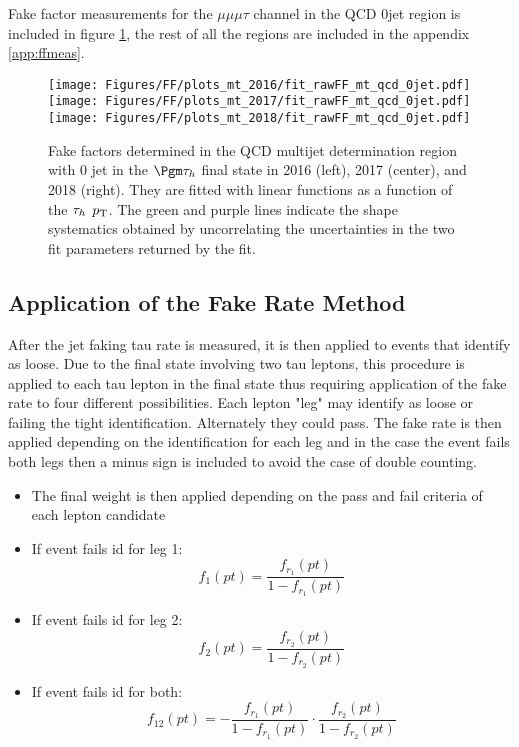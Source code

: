 Fake factor measurements for the $\mu\mu\mu\tau$ channel in the QCD 0jet region is included in figure \ref{fig:fit_raw_mt_0jet_qcd}, the rest of all the regions are included in the appendix \ref{app:ffmeas}.




\begin{figure}[ht!b]
\centering
\texttt{[image: Figures/FF/plots\_mt\_2016/fit\_rawFF\_mt\_qcd\_0jet.pdf]}
\texttt{[image: Figures/FF/plots\_mt\_2017/fit\_rawFF\_mt\_qcd\_0jet.pdf]}
\texttt{[image: Figures/FF/plots\_mt\_2018/fit\_rawFF\_mt\_qcd\_0jet.pdf]}\\
\caption{\label{fig:fit_raw_mt_0jet_qcd} Fake factors determined in the QCD multijet determination region with 0 jet in the $\Pgm\tauh$ final state in 2016 (left), 2017 (center), and 2018 (right). They are fitted with linear functions as a function of the $\tau_h$ $p_{\mathrm{T}}$. The green and purple lines indicate the shape systematics obtained by uncorrelating the uncertainties in the two fit parameters returned by the fit.  }
\end{figure}





\clearpage

\subsection{Application of the Fake Rate Method}

After the jet faking tau rate is measured, it is then applied to events that identify as loose. Due to the final state involving two tau leptons, this procedure is applied to each tau lepton in the final state thus requiring application of the fake rate to four different possibilities. Each lepton "leg" may identify as loose or failing the tight identification. Alternately they could pass. The fake rate is then applied depending on the identification for each leg and in the case the event fails both legs then a minus sign is included to avoid the case of double counting. 
\begin{itemize}
\item{The final weight is then 
applied depending on the 
pass and fail criteria of each 
lepton candidate}
\item{If event fails id for leg 1:\[f_1(pt)=\frac{f_{r_1}(pt)}{1-f_{r_1}(pt)}\]}
\item{If event fails id for leg 2:\[f_2(pt)=\frac{f_{r_2}(pt)}{1-f_{r_2}(pt)}\]}
\item{If event fails id for both:\[f_{12}(pt)=-\frac{f_{r_1}(pt)}{1-f_{r_1}(pt)}\cdot\frac{f_{r_2}(pt)}{1-f_{r_2}(pt)}\]}
\end{itemize}



